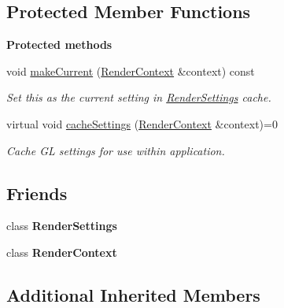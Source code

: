 \subsection*{Protected Member Functions}
\begin{Indent}\textbf{ Protected methods}\par
\begin{DoxyCompactItemize}
\item 
\mbox{\label{classrev_1_1_render_setting_a37b0c3c4ca3d8b5af1e15073204f2a9b}} 
void \mbox{\hyperlink{classrev_1_1_render_setting_a37b0c3c4ca3d8b5af1e15073204f2a9b}{make\+Current}} (\mbox{\hyperlink{classrev_1_1_render_context}{Render\+Context}} \&context) const
\begin{DoxyCompactList}\small\item\em Set this as the current setting in \mbox{\hyperlink{classrev_1_1_render_settings}{Render\+Settings}} cache. \end{DoxyCompactList}\item 
\mbox{\label{classrev_1_1_render_setting_acb8cf7205c0be0ccf848efc9598bd07c}} 
virtual void \mbox{\hyperlink{classrev_1_1_render_setting_acb8cf7205c0be0ccf848efc9598bd07c}{cache\+Settings}} (\mbox{\hyperlink{classrev_1_1_render_context}{Render\+Context}} \&context)=0
\begin{DoxyCompactList}\small\item\em Cache GL settings for use within application. \end{DoxyCompactList}\end{DoxyCompactItemize}
\end{Indent}
\subsection*{Friends}
\begin{DoxyCompactItemize}
\item 
\mbox{\label{classrev_1_1_render_setting_abf433a9c39697ef25510a90f4cf565b0}} 
class {\bfseries Render\+Settings}
\item 
\mbox{\label{classrev_1_1_render_setting_adbc71e71bb875e994e20b698201b22a5}} 
class {\bfseries Render\+Context}
\end{DoxyCompactItemize}
\subsection*{Additional Inherited Members}


